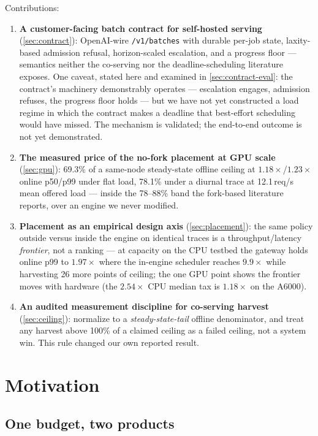 \documentclass[11pt]{article}
\newcommand{\code}[1]{\texttt{#1}}
\begin{document}
\smallskip
\noindent Contributions:
\begin{enumerate}\itemsep2pt
  \item \textbf{A customer-facing batch contract for self-hosted serving}
    (\cref{sec:contract}): OpenAI-wire \code{/v1/batches} with durable per-job state,
    laxity-based admission refusal, horizon-scaled escalation, and a progress floor ---
    semantics neither the co-serving nor the deadline-scheduling literature exposes.
    One caveat, stated here and examined in \cref{sec:contract-eval}: the contract's
    machinery demonstrably operates --- escalation engages, admission refuses, the
    progress floor holds --- but we have not yet constructed a load regime in which the
    contract makes a deadline that best-effort scheduling would have missed. The
    mechanism is validated; the end-to-end outcome is not yet demonstrated.
  \item \textbf{The measured price of the no-fork placement at GPU scale}
    (\cref{sec:gpu}): 69.3\% of a same-node steady-state offline ceiling at
    $1.18\times$/$1.23\times$ online p50/p99 under flat load, 78.1\% under a diurnal
    trace at 12.1\,req/s mean offered load --- inside the 78--88\% band the fork-based
    literature reports, over an engine we never modified.
  \item \textbf{Placement as an empirical design axis} (\cref{sec:placement}): the same
    policy outside versus inside the engine on identical traces is a throughput/latency
    \emph{frontier}, not a ranking --- at capacity on the CPU testbed the gateway holds
    online p99 to $1.97\times$ where the in-engine scheduler reaches $9.9\times$ while
    harvesting 26 more points of ceiling; the one GPU point shows the frontier moves with hardware (the
    $2.54\times$ CPU median tax is $1.18\times$ on the A6000).
  \item \textbf{An audited measurement discipline for co-serving harvest}
    (\cref{sec:ceiling}): normalize to a \emph{steady-state-tail} offline denominator,
    and treat any harvest above 100\% of a claimed ceiling as a failed ceiling, not a
    system win. This rule changed our own reported result.
\end{enumerate}

\section{Motivation}
\label{sec:motivation}

\subsection{One budget, two products}
\label{sec:budget}
\end{document}
